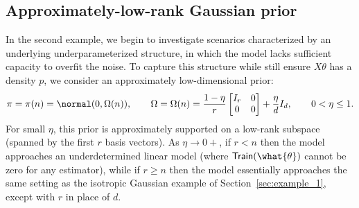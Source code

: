 \documentclass[11pt]{article}
\newcommand{\trerr}{\mathsf{Train}}
\begin{document}
\subsection{Approximately-low-rank Gaussian prior} \label{sec:example_2}
In the second example, we begin to investigate scenarios characterized by an underlying underparameterized structure, in which the model lacks sufficient capacity to overfit the noise. To capture this structure while still ensure $X\theta$ has a density $p$, we consider an approximately low-dimensional prior:
\begin{align}\label{eqn:pi_when_eta>0}
    \pi = \pi(n) = \normal(0, \Omega(n)), \qquad \Omega = \Omega(n) = \frac{1-\eta}{r} \begin{bmatrix} I_r & 0 \\ 0 & 0 \end{bmatrix} + \frac{\eta}{d} I_d, \qquad 0 < \eta \leq 1.
\end{align}
For small $\eta$, this prior is approximately supported on a low-rank subspace (spanned by the first $r$ basis vectors). As $\eta \to 0+$, if $r<n$ then the model approaches an underdetermined linear model (where $\trerr(\what{\theta})$ cannot be zero for any estimator), while if $r\geq n$ then the model essentially approaches the same setting as the isotropic Gaussian example of Section~\ref{sec:example_1}, except with $r$ in place of $d$.
\end{document}
